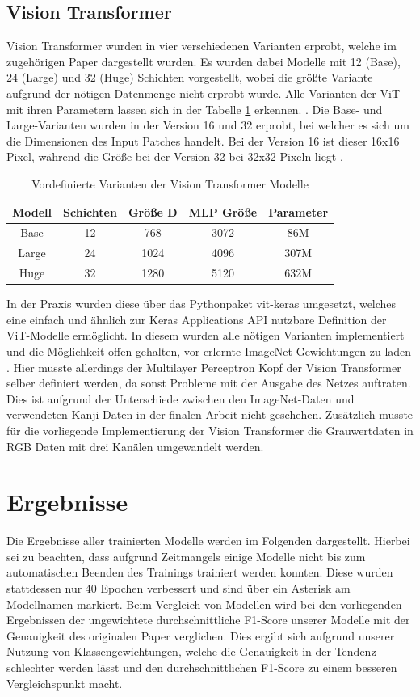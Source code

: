 \documentclass[twoside,a4paper]{IEEEtran}
\begin{document}
\subsection{Vision Transformer} %
Vision Transformer wurden in vier verschiedenen Varianten erprobt, welche im zugehörigen Paper dargestellt wurden. Es wurden dabei Modelle mit 12 (Base), 24 (Large) und 32 (Huge) Schichten vorgestellt, wobei die größte Variante aufgrund der nötigen Datenmenge nicht erprobt wurde. Alle Varianten der ViT mit ihren Parametern lassen sich in der Tabelle \ref{vit_sizes} erkennen. \cite[S.5]{VIT}. Die Base- und Large-Varianten wurden in der Version 16 und 32 erprobt, bei welcher es sich um die Dimensionen des Input Patches handelt. Bei der Version 16 ist dieser 16x16 Pixel, während die Größe bei der Version 32 bei 32x32 Pixeln liegt \cite[S.5]{VIT}. 
\begin{table}[!htb]
	\caption{Vordefinierte Varianten der Vision Transformer Modelle \cite[S.5]{VIT}}
	\label{vit_sizes}
	\centering
	\begin{tabular}{|c|c|c|c|c|}
		\hline
		Modell & Schichten & Größe D & MLP Größe & Parameter\\
		\hline
		\hline
		Base & 12 & 768 & 3072 & 86M\\
		\hline
		Large & 24 & 1024 & 4096 & 307M\\
		\hline
		Huge & 32 & 1280 & 5120 & 632M\\
		\hline 
	\end{tabular}
\end{table}

In der Praxis wurden diese über das Pythonpaket vit-keras umgesetzt, welches eine einfach und ähnlich zur Keras Applications API nutzbare Definition der ViT-Modelle ermöglicht. In diesem wurden alle nötigen Varianten implementiert und die Möglichkeit offen gehalten, vor erlernte ImageNet-Gewichtungen zu laden \cite{git_vit}.  Hier musste allerdings der Multilayer Perceptron Kopf der Vision Transformer selber definiert werden, da sonst Probleme mit der Ausgabe des Netzes auftraten. Dies ist aufgrund der Unterschiede zwischen den ImageNet-Daten und verwendeten Kanji-Daten in der finalen Arbeit nicht geschehen. Zusätzlich musste für die vorliegende Implementierung der Vision Transformer die Grauwertdaten in RGB Daten mit drei Kanälen umgewandelt werden. 
\section{Ergebnisse} %
Die Ergebnisse aller trainierten Modelle werden im Folgenden dargestellt. Hierbei sei zu beachten, dass aufgrund Zeitmangels einige Modelle nicht bis zum automatischen Beenden des Trainings trainiert werden konnten. Diese wurden stattdessen nur 40 Epochen verbessert und sind über ein Asterisk am Modellnamen markiert. Beim Vergleich von Modellen wird bei den vorliegenden Ergebnissen der ungewichtete durchschnittliche F1-Score unserer Modelle mit der Genauigkeit des originalen Paper verglichen. Dies ergibt sich aufgrund unserer Nutzung von Klassengewichtungen, welche die Genauigkeit in der Tendenz schlechter werden lässt und den durchschnittlichen F1-Score zu einem besseren Vergleichspunkt macht. 
\end{document}
